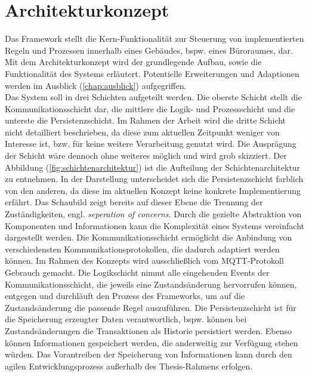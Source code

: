 \section{Architekturkonzept}
\label{sec:architekturkonzept}
    Das Framework stellt die Kern-Funktionalität zur Steuerung von implementierten Regeln und Prozessen innerhalb eines 
    Gebäudes, bspw. eines Büroraumes, dar. Mit dem Architekturkonzept wird der grundlegende Aufbau, sowie die Funktionalität des Systems erläutert. 
    Potentielle Erweiterungen und Adaptionen werden im Ausblick (\ref{chap:ausblick}) aufgegriffen.
    \\ 
    \linebreak
    Das System soll in drei Schichten aufgeteilt werden. Die oberste Schicht stellt die Kommunikationsschicht dar, die mittlere 
    die Logik- und Prozessschicht und die unterste die Persistenzschicht. Im Rahmen der Arbeit wird 
    die dritte Schicht nicht detailliert beschrieben, da diese zum aktuellen Zeitpunkt weniger von Interesse ist, bzw. für keine weitere Verarbeitung 
    genutzt wird. Die Ausprägung der Schicht wäre dennoch ohne weiteres möglich und wird grob skizziert. Der Abbildung 
    (\ref{fig:schichtenarchitektur}) ist die Aufteilung der Schichtenarchitektur zu entnehmen. In der Darstellung unterscheidet sich die 
    Persistenzschicht farblich von den anderen, da diese im aktuellen Konzept keine konkrete Implementierung erfährt. 
    Das Schaubild zeigt bereits auf dieser Ebene die Trennung der Zuständigkeiten, engl. \textit{seperation of concerns}. 
    Durch die gezielte Abstraktion von Komponenten und Informationen kann die Komplexität 
    eines Systems vereinfacht dargestellt werden. Die Kommunikationsschicht ermöglicht die Anbindung von verschiedensten Kommunikationsprotokollen, die 
    dadurch adaptiert werden können. Im Rahmen des Konzepts wird ausschließlich vom \acs{MQTT}-Protokoll Gebrauch gemacht. 
    Die Logikschicht nimmt alle eingehenden Events der Kommunikationsschicht, die jeweils eine Zustandsänderung hervorrufen können, entgegen 
    und durchläuft den Prozess des Frameworks, um auf die Zustandsänderung die passende Regel auszuführen. Die 
    Persistenzschicht ist für die Speicherung erzeugter Daten verantwortlich, bspw. können bei Zustandsänderungen die Transaktionen 
    als Historie persistiert werden. Ebenso können Informationen gespeichert werden, die anderweitig zur Verfügung stehen würden. Das Vorantreiben der Speicherung 
    von Informationen kann durch den agilen Entwicklungsprozess außerhalb des Thesis-Rahmens erfolgen. 
